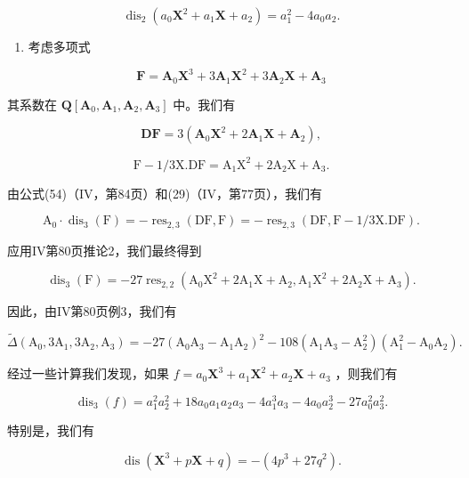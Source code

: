 \[
\operatorname{dis} _ {2} \left(a _ {0} \mathbf {X} ^ {2} + a _ {1} \mathbf {X} + a _ {2}\right) = a _ {1} ^ {2} - 4 a _ {0} a _ {2}.
\]

\begin{enumerate}
\def\labelenumi{\arabic{enumi})}
\setcounter{enumi}{3}
\tightlist
\item
  考虑多项式
\end{enumerate}

\[
\mathbf {F} = \mathbf {A} _ {0} \mathbf {X} ^ {3} + 3 \mathbf {A} _ {1} \mathbf {X} ^ {2} + 3 \mathbf {A} _ {2} \mathbf {X} + \mathbf {A} _ {3}
\]

其系数在 \(\mathbf{Q}[\mathbf{A}_0,\mathbf{A}_1,\mathbf{A}_2,\mathbf{A}_3]\) 中。我们有

\[
\mathbf {D F} = 3 \left(\mathbf {A} _ {0} \mathbf {X} ^ {2} + 2 \mathbf {A} _ {1} \mathbf {X} + \mathbf {A} _ {2}\right),
\]

\[
\mathrm{F} - 1 / 3 \mathrm{X}. \mathrm{DF} = \mathrm{A} _ {1} \mathrm{X} ^ {2} + 2 \mathrm{A} _ {2} \mathrm{X} + \mathrm{A} _ {3}.
\]

由公式(54)（IV，第84页）和(29)（IV，第77页），我们有

\[
\mathrm{A} _ {0} \cdot \operatorname{dis} _ {3} (\mathrm{F}) = - \operatorname{res} _ {2, 3} (\mathrm{DF}, \mathrm{F}) = - \operatorname{res} _ {2, 3} (\mathrm{DF}, \mathrm{F} - 1 / 3 \mathrm{X}. \mathrm{DF}).
\]

应用IV第80页推论2，我们最终得到

\[
\operatorname{dis} _ {3} (\mathrm{F}) = - 2 7 \operatorname{res} _ {2, 2} \left(\mathrm{A} _ {0} \mathrm{X} ^ {2} + 2 \mathrm{A} _ {1} \mathrm{X} + \mathrm{A} _ {2}, \mathrm{A} _ {1} \mathrm{X} ^ {2} + 2 \mathrm{A} _ {2} \mathrm{X} + \mathrm{A} _ {3}\right).
\]

因此，由IV第80页例3，我们有

\[
\tilde {\Delta} \left(\mathrm{A} _ {0}, 3 \mathrm{A} _ {1}, 3 \mathrm{A} _ {2}, \mathrm{A} _ {3}\right) = - 2 7 \left(\mathrm{A} _ {0} \mathrm{A} _ {3} - \mathrm{A} _ {1} \mathrm{A} _ {2}\right) ^ {2} - 1 0 8 \left(\mathrm{A} _ {1} \mathrm{A} _ {3} - \mathrm{A} _ {2} ^ {2}\right) \left(\mathrm{A} _ {1} ^ {2} - \mathrm{A} _ {0} \mathrm{A} _ {2}\right).
\]

经过一些计算我们发现，如果 \(f = a_0\mathbf{X}^3 + a_1\mathbf{X}^2 + a_2\mathbf{X} + a_3\) ，则我们有

\[
\operatorname{dis} _ {3} (f) = a _ {1} ^ {2} a _ {2} ^ {2} + 1 8 a _ {0} a _ {1} a _ {2} a _ {3} - 4 a _ {1} ^ {3} a _ {3} - 4 a _ {0} a _ {2} ^ {3} - 2 7 a _ {0} ^ {2} a _ {3} ^ {2}.
\]

特别是，我们有

\[
\operatorname{dis} \left(\mathbf {X} ^ {3} + p \mathbf {X} + q\right) = - \left(4 p ^ {3} + 2 7 q ^ {2}\right).
\]

